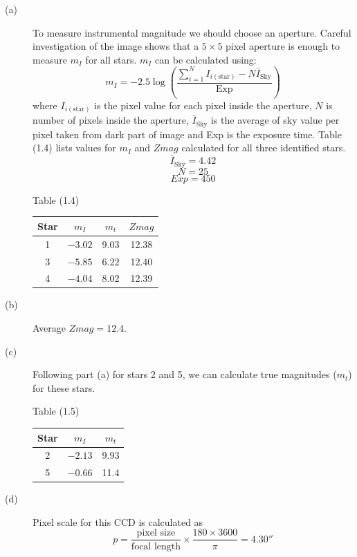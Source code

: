 \begin{description}
\item[(a)] To measure instrumental magnitude we should choose an aperture.
Careful investigation of the image shows that a $5 \times 5$ pixel aperture
is enough to measure $m_I$ for all stars. $m_I$ can be calculated using:
\[ m_I = -2.5\log\!\left(\frac{\sum_{i=1}^{N} I_{i(\mathrm{star})} - N\bar{I}_{\mathrm{Sky}}}{\mathrm{Exp}}\right) \]
where $I_{i(\mathrm{star})}$ is the pixel value for each pixel inside the
aperture, $N$ is number of pixels inside the aperture,
$\bar{I}_{\mathrm{Sky}}$ is the average of sky value per pixel taken from
dark part of image and Exp is the exposure time. Table (1.4) lists values
for $m_I$ and $Zmag$ calculated for all three identified stars.
\[ \bar{I}_{\mathrm{Sky}} = 4.42 \]
\[ N = 25 \]
\[ Exp = 450 \]

\begin{center}
Table (1.4)\\[2pt]
\begin{tabular}{|c|c|c|c|}
\hline
Star & $m_I$ & $m_t$ & $Zmag$ \\
\hline
1 & $-3.02$ & 9.03 & 12.38 \\
\hline
3 & $-5.85$ & 6.22 & 12.40 \\
\hline
4 & $-4.04$ & 8.02 & 12.39 \\
\hline
\end{tabular}
\end{center}

\item[(b)] Average $Zmag = 12.4$.

\item[(c)] Following part (a) for stars 2 and 5, we can calculate true
magnitudes ($m_t$) for these stars.

\begin{center}
Table (1.5)\\[2pt]
\begin{tabular}{|c|c|c|}
\hline
Star & $m_I$ & $m_t$ \\
\hline
2 & $-2.13$ & 9.93 \\
\hline
5 & $-0.66$ & 11.4 \\
\hline
\end{tabular}
\end{center}

\item[(d)] Pixel scale for this CCD is calculated as
\[ p = \frac{\text{pixel size}}{\text{focal length}} \times \frac{180 \times 3600}{\pi} = 4.30'' \]


\end{description}
